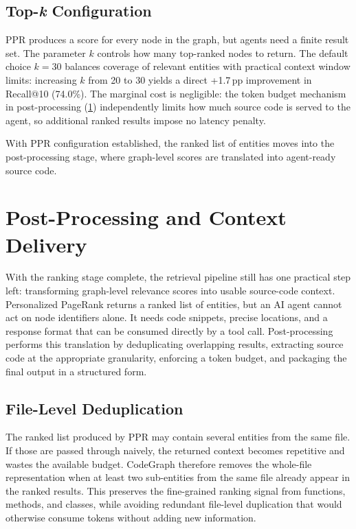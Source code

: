 \subsection{Top-\textit{k} Configuration}
\label{sec:topk}

PPR produces a score for every node in the graph, but agents need a finite result set. The parameter $k$ controls how many top-ranked nodes to return. The default choice $k = 30$ balances coverage of relevant entities with practical context window limits: increasing $k$ from 20 to 30 yields a direct +1.7\,pp improvement in Recall@10 (74.0\%). The marginal cost is negligible: the token budget mechanism in post-processing (\cref{sec:post-processing}) independently limits how much source code is served to the agent, so additional ranked results impose no latency penalty.

With PPR configuration established, the ranked list of entities moves into the post-processing stage, where graph-level scores are translated into agent-ready source code.


\section{Post-Processing and Context Delivery}
\label{sec:post-processing}

With the ranking stage complete, the retrieval pipeline still has one practical step left: transforming graph-level relevance scores into usable source-code context. Personalized PageRank returns a ranked list of entities, but an AI agent cannot act on node identifiers alone. It needs code snippets, precise locations, and a response format that can be consumed directly by a tool call. Post-processing performs this translation by deduplicating overlapping results, extracting source code at the appropriate granularity, enforcing a token budget, and packaging the final output in a structured form.

\subsection{File-Level Deduplication}
\label{sec:file-dedup}

The ranked list produced by PPR may contain several entities from the same file. If those are passed through naively, the returned context becomes repetitive and wastes the available budget. CodeGraph therefore removes the whole-file representation when at least two sub-entities from the same file already appear in the ranked results. This preserves the fine-grained ranking signal from functions, methods, and classes, while avoiding redundant file-level duplication that would otherwise consume tokens without adding new information.

